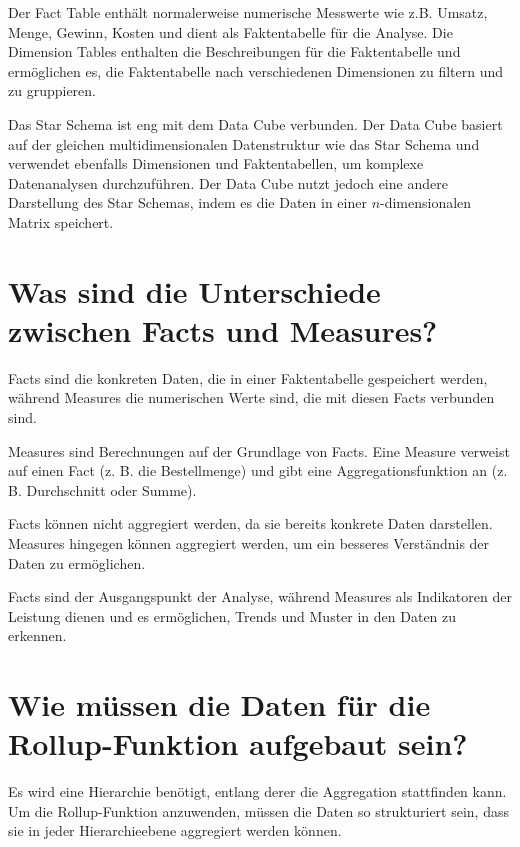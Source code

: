 \documentclass{article}
\begin{document}
	Der Fact Table enthält normalerweise numerische Messwerte wie z.B. Umsatz, Menge, Gewinn, Kosten und dient als Faktentabelle für die Analyse. Die Dimension Tables enthalten die Beschreibungen für die Faktentabelle und ermöglichen es, die Faktentabelle nach verschiedenen Dimensionen zu filtern und zu gruppieren.
	
	Das Star Schema ist eng mit dem Data Cube verbunden. Der Data Cube basiert auf der gleichen multidimensionalen Datenstruktur wie das Star Schema und verwendet ebenfalls Dimensionen und Faktentabellen, um komplexe Datenanalysen durchzuführen. Der Data Cube nutzt jedoch eine andere Darstellung des Star Schemas, indem es die Daten in einer $n$-dimensionalen Matrix speichert.
	
	\section*{Was sind die Unterschiede zwischen Facts und Measures?}
	Facts sind die konkreten Daten, die in einer Faktentabelle gespeichert werden, während Measures die numerischen Werte sind, die mit diesen Facts verbunden sind.
	
	Measures sind Berechnungen auf der Grundlage von Facts. Eine Measure verweist auf einen Fact (z. B. die Bestellmenge) und gibt eine Aggregationsfunktion an (z. B. Durchschnitt oder Summe).
	
	Facts können nicht aggregiert werden, da sie bereits konkrete Daten darstellen. Measures hingegen können aggregiert werden, um ein besseres Verständnis der Daten zu ermöglichen.
	
	Facts sind der Ausgangspunkt der Analyse, während Measures als Indikatoren der Leistung dienen und es ermöglichen, Trends und Muster in den Daten zu erkennen.
	
	\section*{Wie müssen die Daten für die Rollup-Funktion aufgebaut sein?}
	Es wird eine Hierarchie benötigt, entlang derer die Aggregation stattfinden kann. Um die Rollup-Funktion anzuwenden, müssen die Daten so strukturiert sein, dass sie in jeder Hierarchieebene aggregiert werden können.
	
\end{document}
